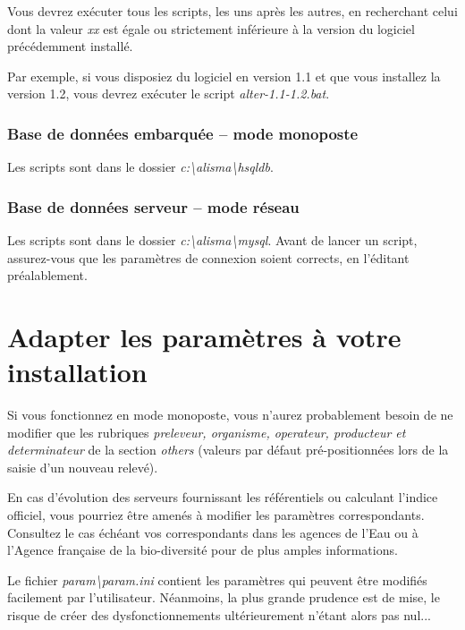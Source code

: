 Vous devrez exécuter tous les scripts, les uns après les autres, en recherchant celui dont la valeur \textit{xx} est égale ou strictement inférieure à la version du logiciel précédemment installé.

Par exemple, si vous disposiez du logiciel en version 1.1 et que vous installez la version 1.2, vous devrez exécuter le script \textit{alter-1.1-1.2.bat}.

\subsubsection{Base de données embarquée -- mode monoposte}

Les scripts sont dans le dossier \textit{\NoAutoSpaceBeforeFDP c:\textbackslash{}alisma\textbackslash{}hsqldb}.

\subsubsection{Base de données serveur -- mode réseau}

Les scripts sont dans le dossier \textit{\NoAutoSpaceBeforeFDP c:\textbackslash{}alisma\textbackslash{}mysql}. Avant de lancer un script, assurez-vous que les paramètres de connexion soient corrects, en l'éditant préalablement.

\section{Adapter les paramètres à votre installation}
\label{sec:param}

Si vous fonctionnez en mode monoposte, vous n'aurez probablement besoin de ne  modifier que les rubriques \textit{preleveur, organisme, operateur, producteur et determinateur} de la section \textit{others} (valeurs par défaut pré-positionnées lors de la saisie d'un nouveau relevé).

En cas d'évolution des serveurs fournissant les référentiels ou calculant l'indice officiel, vous pourriez être amenés à modifier les paramètres correspondants. Consultez le cas échéant vos correspondants dans les agences de l'Eau ou à l'Agence française de la bio-diversité pour de plus amples informations.

Le fichier \textit{param\textbackslash{}param.ini} contient les paramètres qui peuvent être modifiés facilement par l'utilisateur. Néanmoins, la plus grande prudence est de mise, le risque de créer des dysfonctionnements ultérieurement n'étant alors pas nul...

